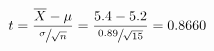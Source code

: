 \begin{equation*}
    t=\frac{\overline{X}-\mu}{\sfrac{\sigma}{\sqrt{n}}}
    =\frac{5.4-5.2}{\sfrac{0.89}{\sqrt{15}}}=0.8660
    \end{equation*}